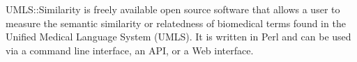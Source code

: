 UMLS::Similarity is freely available open source software that allows a user to measure the semantic similarity or relatedness of biomedical terms found in the
 Unified Medical Language System (UMLS). It is written in Perl and can be used
 via a command line interface, an API, or a Web interface.

